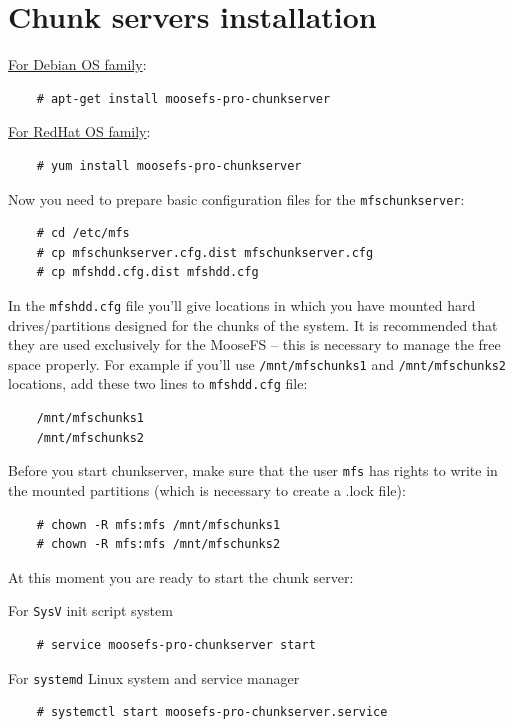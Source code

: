 \documentclass[a4paper,11pt,english]{report}
\def\code#1{\texttt{#1}}
\begin{document}
		
		\section{Chunk servers installation}

		\underline{For Debian OS family}:
		\begin{lstlisting}
	# apt-get install moosefs-pro-chunkserver
		\end{lstlisting}
		

		\underline{For RedHat OS family}:
		\begin{lstlisting}
	# yum install moosefs-pro-chunkserver
		\end{lstlisting}

		
		Now you need to prepare basic configuration files for the \code{mfschunkserver}:
		\begin{lstlisting}
	# cd /etc/mfs
	# cp mfschunkserver.cfg.dist mfschunkserver.cfg
	# cp mfshdd.cfg.dist mfshdd.cfg
		\end{lstlisting}
		
		
		In the \code{mfshdd.cfg} file you'll give locations in which you have mounted hard drives/partitions designed for the chunks of the system. It is recommended that they are used exclusively for the MooseFS -- this is necessary to manage the free space properly. For example if you'll use \code{/mnt/mfschunks1} and \code{/mnt/mfschunks2} locations, add these two lines to \code{mfshdd.cfg} file:

		\begin{lstlisting}
	/mnt/mfschunks1
	/mnt/mfschunks2
		\end{lstlisting}


		Before you start chunkserver, make sure that the user \code{mfs} has rights to write in the mounted partitions (which is necessary to create a .lock file):

		\begin{lstlisting}
	# chown -R mfs:mfs /mnt/mfschunks1
	# chown -R mfs:mfs /mnt/mfschunks2
		\end{lstlisting}

		
		At this moment you are ready to start the chunk server:
			
		For \code{SysV} init script system
		\begin{lstlisting}
	# service moosefs-pro-chunkserver start
		\end{lstlisting}
		
		For \code{systemd} Linux system and service manager 
		\begin{lstlisting}
	# systemctl start moosefs-pro-chunkserver.service
		\end{lstlisting}
		
\end{document}
